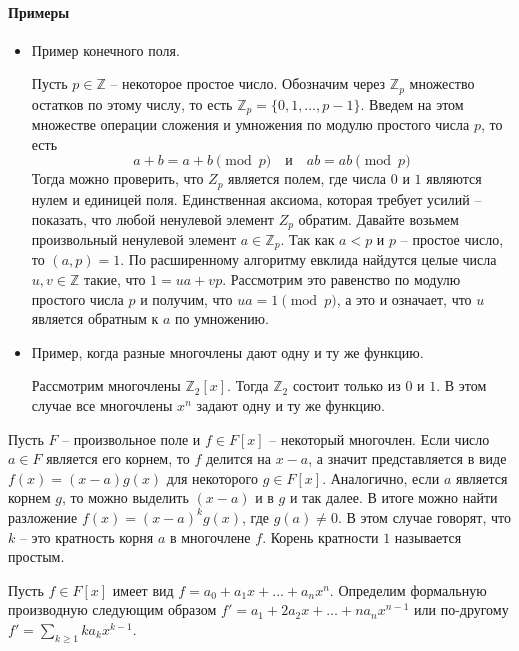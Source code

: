 \paragraph{Примеры}

\begin{itemize}
\item Пример конечного поля.

Пусть $p\in \mathbb Z$ -- некоторое простое число.
Обозначим через $\mathbb Z_p$ множество остатков по этому числу, то есть $\mathbb Z_p = \{0, 1, \ldots, p-1\}$.
Введем на этом множестве операции сложения и умножения по модулю простого числа $p$, то есть
\[
a + b = a + b\pmod p\quad \text{и}\quad a b = ab \pmod p
\]
Тогда можно проверить, что $Z_p$ является полем, где числа $0$ и $1$ являются нулем и единицей поля.
Единственная аксиома, которая требует усилий -- показать, что любой ненулевой элемент $Z_p$ обратим.
Давайте возьмем произвольный ненулевой элемент $a\in \mathbb Z_p$.
Так как $ a < p$ и $p$ -- простое число, то $(a, p) =1$.
По расширенному алгоритму евклида найдутся целые числа $u, v\in\mathbb Z$ такие, что $1 = u a + vp$.
Рассмотрим это равенство по модулю простого числа $p$ и получим, что
$u a = 1 \pmod p$, а это и означает, что $u$ является обратным к $a$ по умножению.

\item Пример, когда разные многочлены дают одну и ту же функцию.

Рассмотрим многочлены $\mathbb Z_2[x]$.
Тогда $\mathbb Z_2$ состоит только из $0$ и $1$.
В этом случае все многочлены $x^n$ задают одну и ту же функцию.
\end{itemize}

\begin{definition}
 Пусть $F$ -- произвольное поле и $f\in F[x]$ -- некоторый многочлен.
 Если число $a\in F$ является его корнем, то $f$ делится на $x - a$, а значит представляется в виде $f(x) = (x - a) g(x)$ для некоторого $g\in F[x]$.
 Аналогично, если $a$ является корнем $g$, то можно выделить $(x - a)$ и в $g$ и так далее.
 В итоге можно найти разложение $f(x) = (x - a)^k g(x)$, где $g(a) \neq 0$.
 В этом случае говорят, что $k$ -- это кратность корня $a$ в многочлене $f$.
 Корень кратности $1$ называется простым.
\end{definition}


\begin{definition}
Пусть $f\in F[x]$ имеет вид $f = a_0 + a_1 x + \ldots + a_n x^n$.
Определим формальную производную следующим образом $f' = a_1 + 2a_2 x+\ldots + na_n x^{n-1}$ или по-другому $f'=\sum_{k\geqslant 1} k a_k x^{k-1}$.
\end{definition}

